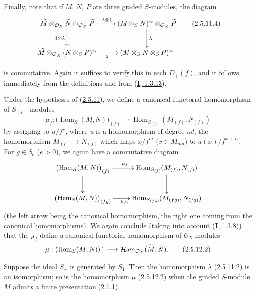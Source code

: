 \begin{env}[2.5.11]
Finally, note that if $M$, $N$, $P$ are three graded $S$-modules, the
diagram
\[
\label{II.2.5.11.4}
  \xymatrix{
    \widetilde{M}\otimes_{\mathcal{O}_X}\widetilde{N}
    \otimes_{\mathcal{O}_X}\widetilde{P}
    \ar[r]^{\lambda\otimes1}\ar[d]_{1\otimes\lambda}
    & (M\otimes_S N)\supertilde\otimes_{\mathcal{O}_X}\widetilde{P}
    \ar[d]^\lambda\\
    \widetilde{M}\otimes_{\mathcal{O}_X}(N\otimes_S P)\supertilde
    \ar[r]_\lambda
    & (M\otimes_S N\otimes_S P)\supertilde
  }
\tag{2.5.11.4}
\]

is commutative. Again it suffices to verify this in each $D_+(f)$, and
it follows immediately from the definitions and from
(\hyperref[I.1.3.13]{\textbf{I}, 1.3.13}).
\end{env}

\begin{env}[2.5.12]
\label{II.2.5.12}
Under the hypotheses of (\hyperref[II.2.5.11]{2.5.11}), we define a
canonical functorial homomorphism of $S_{(f)}$-modules
\[
\label{II.2.5.12.1}
  \mu_f:\bigl(\operatorname{Hom}_S(M,N)\bigr)_{(f)}
  \longrightarrow
  \operatorname{Hom}_{S_{(f)}}(M_{(f)},N_{(f)})
\tag{2.5.12.1}
\]
by assigning to $u/f^n$, where $u$ is a homomorphism of degree
$nd$, the homomorphism $M_{(f)}\to N_{(f)}$ which maps $x/f^m$
($x\in M_{md}$) to $u(x)/f^{m+n}$. For $g\in S_e$ ($e>0$), we again have
a commutative diagram
\[
  \xymatrix{
    \bigl(\operatorname{Hom}_S(M,N)\bigr)_{(f)}
    \ar[r]^{\mu_f}\ar[d]
    & \operatorname{Hom}_{S_{(f)}}(M_{(f)},N_{(f)})\ar[d]\\
    \bigl(\operatorname{Hom}_S(M,N)\bigr)_{(fg)}
    \ar[r]_{\mu_{fg}}
    & \operatorname{Hom}_{S_{(fg)}}(M_{(fg)},N_{(fg)})
  }
\]
(the left arrow being the canonical homomorphism, the right one
coming from the canonical homomorphisms). We again conclude (taking into
account (\hyperref[I.1.3.8]{\textbf{I}, 1.3.8})) that the $\mu_f$ define a
canonical functorial homomorphism of $\mathcal{O}_X$-modules
\[
\label{II.2.5.12.2}
  \mu:(\operatorname{Hom}_S(M,N))^{\sim}
  \longrightarrow
  \mathcal{H}om_{\mathcal{O}_X}(\widetilde{M},\widetilde{N}).
\tag{2.5.12.2}
\]
\end{env}

\begin{proposition}[2.5.13]
\label{II.2.5.13}
Suppose the ideal $S_+$ is generated by $S_1$. Then the homomorphism
$\lambda$ \textup{(\hyperref[II.2.5.11.2]{2.5.11.2})} is an isomorphism; so is
the homomorphism $\mu$
\textup{(\hyperref[II.2.5.12.2]{2.5.12.2})} when the graded $S$-module $M$
admits a finite presentation \textup{(\hyperref[II.2.1.1]{2.1.1})}.
\end{proposition}

